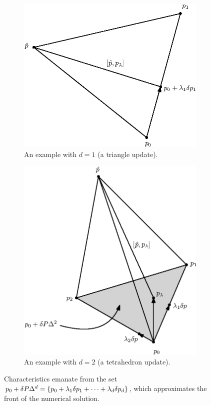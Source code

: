 \documentclass[sisc-eikonal.tex]{subfiles}
\begin{document}
\begin{figure}
  \centering
  \begin{subfigure}{.4\textwidth}
    \centering
    \includegraphics[width=\linewidth]{tri-diagram.eps}
    \caption{An example with $d = 1$ (a triangle
      update).}\label{fig:tri-diagram}
  \end{subfigure}%
  \begin{subfigure}{.4\textwidth}
    \centering
    \includegraphics[width=\linewidth]{simplex-diagram.eps}
    \caption{An example with $d = 2$ (a tetrahedron
      update).}\label{fig:tetra-diagram}
  \end{subfigure}
  \caption{Characteristics emanate from the set
    $p_0 + \delta P \Delta^d = \left\{p_0 + \lambda_1 \delta p_1 +
      \cdots + \lambda_d \delta p_d\right\}$, which approximates the front of
    the numerical solution.}\label{fig:simplex-diagrams}
\end{figure}
\end{document}
